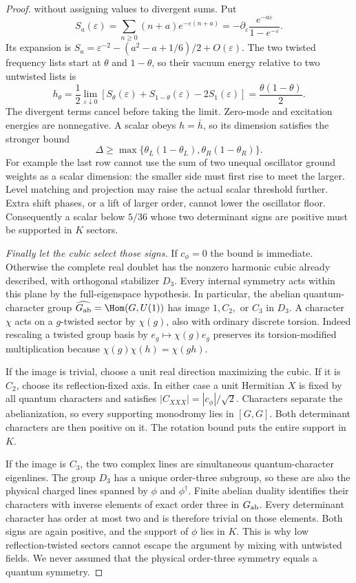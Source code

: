 \begin{proof}
without assigning values to divergent sums. Put
\[
 S_a(\varepsilon)=\sum_{n\geq0}(n+a)e^{-\varepsilon(n+a)}
 =-\partial_\varepsilon
       \frac{e^{-a\varepsilon}}{1-e^{-\varepsilon}}.
\]
Its expansion is
$S_a=\varepsilon^{-2}-(a^2-a+1/6)/2+O(\varepsilon)$.
The two twisted frequency lists start at $\theta$ and
$1-\theta$, so their vacuum energy relative to two untwisted
lists is
\[
 h_\theta=\frac12\lim_{\varepsilon\downarrow0}
 [S_\theta(\varepsilon)+S_{1-\theta}(\varepsilon)
                      -2S_1(\varepsilon)]
 =\frac{\theta(1-\theta)}2.
\]
The divergent terms cancel before taking the limit. Zero-mode
and excitation energies are nonnegative. A scalar obeys
$h=\bar h$, so its dimension satisfies the stronger bound
\[
 \Delta\geq\max\{\theta_L(1-\theta_L),
                         \theta_R(1-\theta_R)\}.
\]
For example the last row cannot use the sum of two unequal
oscillator ground weights as a scalar dimension: the smaller
side must first rise to meet the larger. Level matching and
projection may raise the actual scalar threshold further.
Extra shift phases, or a lift of larger order, cannot lower
the oscillator floor. Consequently a scalar below $5/36$
whose two determinant signs are positive must be supported in
$K$ sectors.

\emph{Finally let the cubic select those signs.}
If $c_\phi=0$ the bound is immediate. Otherwise the complete
real doublet has the nonzero harmonic cubic already described,
with orthogonal stabilizer $D_3$. Every internal symmetry acts
within this plane by the full-eigenspace hypothesis. In particular,
the abelian quantum-character group
$\widehat{G_{\rm ab}}=\Hom(G,U(1))$ has image $1,C_2,$ or
$C_3$ in $D_3$. A character $\chi$ acts on a $g$-twisted
sector by $\chi(g)$, also with ordinary discrete torsion.
Indeed rescaling a twisted group basis by $e_g\mapsto\chi(g)e_g$
preserves its torsion-modified multiplication because
$\chi(g)\chi(h)=\chi(gh)$.

If the image is trivial, choose a unit real direction maximizing
the cubic. If it is $C_2$, choose its reflection-fixed axis.
In either case a unit Hermitian $X$ is fixed by all quantum
characters and satisfies $|C_{XXX}|=|c_\phi|/\sqrt2$.
Characters separate the abelianization, so every supporting
monodromy lies in $[G,G]$. Both determinant characters are then
positive on it. The rotation bound puts the entire support in $K$.

If the image is $C_3$, the two complex lines are simultaneous
quantum-character eigenlines. The group $D_3$ has a unique
order-three subgroup, so these are also the physical charged
lines spanned by $\phi$ and $\phi^\dagger$. Finite abelian duality identifies
their characters with inverse elements of exact order three
in $G_{\rm ab}$. Every determinant character has order at most
two and is therefore trivial on those elements. Both signs
are again positive, and the support of $\phi$ lies in $K$.
This is why low reflection-twisted sectors cannot escape the
argument by mixing with untwisted fields. We never assumed that
the physical order-three symmetry equals a quantum symmetry.


\end{proof}
